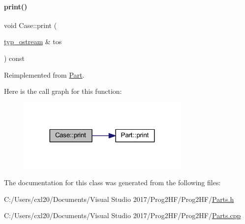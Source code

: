 \paragraph{\texorpdfstring{print()}{print()}\hspace{0.1cm}{\footnotesize\ttfamily [4/4]}}
{\footnotesize\ttfamily void Case\+::print (\begin{DoxyParamCaption}\item[{\mbox{\hyperlink{structtyp__ostream}{typ\+\_\+ostream}} \&}]{tos }\end{DoxyParamCaption}) const\hspace{0.3cm}{\ttfamily [virtual]}}



Reimplemented from \mbox{\hyperlink{class_part_ab6396030e8b7a724731a8b54bd4942fc}{Part}}.

Here is the call graph for this function\+:
\nopagebreak
\begin{figure}[H]
\begin{center}
\leavevmode
\includegraphics[width=239pt]{class_case_a6cce910485e45c0b30018fce491c154f_cgraph}
\end{center}
\end{figure}


The documentation for this class was generated from the following files\+:\begin{DoxyCompactItemize}
\item 
C\+:/\+Users/cxl20/\+Documents/\+Visual Studio 2017/\+Prog2\+H\+F/\+Prog2\+H\+F/\mbox{\hyperlink{_parts_8h}{Parts.\+h}}\item 
C\+:/\+Users/cxl20/\+Documents/\+Visual Studio 2017/\+Prog2\+H\+F/\+Prog2\+H\+F/\mbox{\hyperlink{_parts_8cpp}{Parts.\+cpp}}\end{DoxyCompactItemize}
